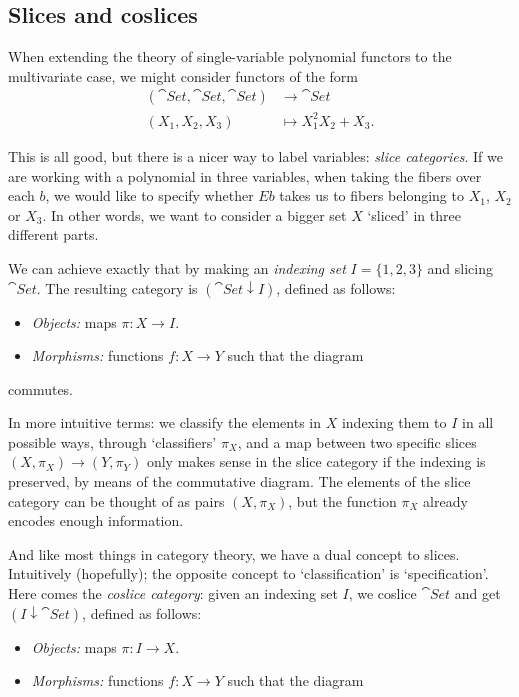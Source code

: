 \subsection{Slices and coslices}

When extending the theory of single-variable polynomial functors to the multivariate case, we might consider functors of the form
\begin{align*}
	(\cat{Set},\cat{Set},\cat{Set}) &\to \cat{Set}\\
    (X_1,X_2,X_3) &\mapsto X_1^2X_2 + X_3.
\end{align*}

This is all good, but there is a nicer way to label variables: \emph{slice categories}. If we are working with a polynomial in three variables, when taking the fibers over each $b$, we would like to specify whether $Eb$ takes us to fibers belonging to $X_1$, $X_2$ or $X_3$. In other words, we want to consider a bigger set $X$ `sliced' in three different parts.

We can achieve exactly that by making an \emph{indexing set} $I=\{1,2,3\}$ and slicing $\cat{Set}$. The resulting category is $(\cat{Set}\downarrow I)$, defined as follows:
\begin{itemize}
\item \emph{Objects:} maps $\pi:X\to I$.
\item \emph{Morphisms:} functions $f:X\to Y$ such that the diagram
\end{itemize}

\begin{figure}[ht!]
\centering
{}
\end{figure}
commutes.

In more intuitive terms: we classify the elements in $X$ indexing them to $I$ in all possible ways, through `classifiers' $\pi_X$, and a map between two specific slices $(X,\pi_X)\to(Y,\pi_Y)$ only makes sense in the slice category if the indexing is preserved, by means of the commutative diagram. The elements of the slice category can be thought of as pairs $(X,\pi_X)$, but the function $\pi_X$ already encodes enough information.

And like most things in category theory, we have a dual concept to slices. Intuitively (hopefully); the opposite concept to `classification' is `specification'. Here comes the \emph{coslice category}: given an indexing set $I$, we coslice $\cat{Set}$ and get $(I\downarrow\cat{Set})$, defined as follows:
\begin{itemize}
\item \emph{Objects:} maps $\pi:I\to X$.
\item \emph{Morphisms:} functions $f:X\to Y$ such that the diagram
\end{itemize}

